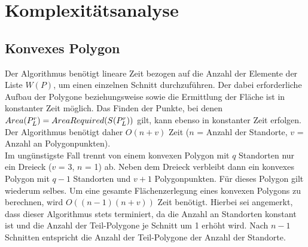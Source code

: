 \documentclass[ngerman]{seminarbeitrag}
\begin{document}
\section{Komplexitätsanalyse}\label{komplex}
\subsection{Konvexes Polygon}
Der Algorithmus \con benötigt lineare Zeit bezogen auf die Anzahl der Elemente der Liste $W(P)$, um einen einzelnen Schnitt durchzuführen. Der dabei erforderliche Aufbau der Polygone \prl beziehungsweise \pll sowie die Ermittlung der Fläche ist in konstanter Zeit möglich. Das Finden der Punkte, bei denen $Area(P_{L}^{r}) = AreaRequired(S(P_{L}^{r}))$ gilt, kann ebenso in konstanter Zeit erfolgen. Der Algorithmus \con benötigt daher $O(n+v)$ Zeit ($n$ = Anzahl der Standorte, $v$ = Anzahl an Polygonpunkten).\\
Im ungünstigste Fall trennt \con von einem konvexen Polygon mit $q$ Standorten nur ein Dreieck ($v$ = 3, $n$ = 1) ab. Neben dem Dreieck verbleibt dann ein konvexes Polygon mit $q-1$ Standorten und $v+1$ Polygonpunkten. Für dieses Polygon gilt wiederum selbes. Um eine gesamte Flächenzerlegung eines konvexen Polygons zu berechnen, wird $O((n-1)(n+v))$ Zeit benötigt. 
Hierbei sei angemerkt, dass dieser Algorithmus stets terminiert, da die Anzahl an Standorten konstant ist und die Anzahl der Teil-Polygone je Schnitt um 1 erhöht wird. Nach $n-1$ Schnitten entspricht die Anzahl der Teil-Polygone der Anzahl der Standorte.
\end{document}
